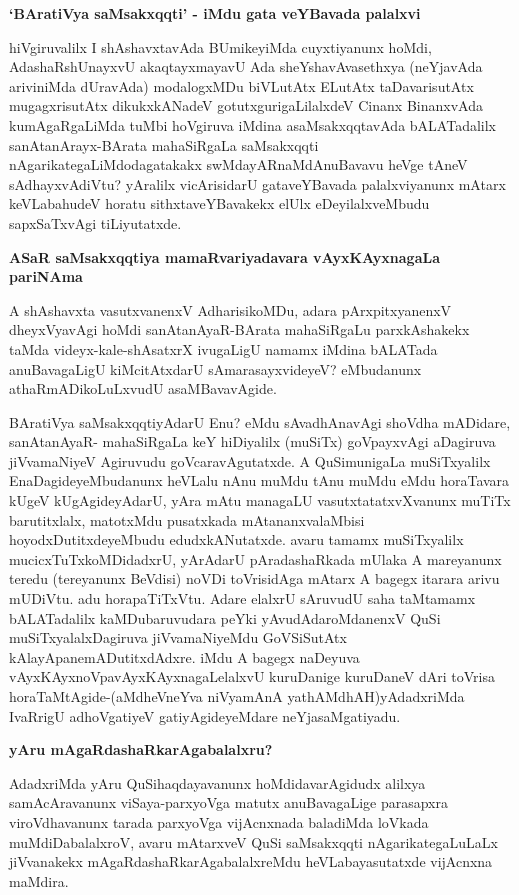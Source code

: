{\bigskip
\noindent
{\large\bf `BAratiVya saMsakxqqti' - iMdu gata veYBavada palalxvi}}\label{page23a}
\medskip

\noindent
hiVgiruvalilx I shAshavxtavAda BUmikeyiMda cuyxtiyanunx hoMdi, AdashaR\-shUnayxvU akaqtayxmayavU Ada sheYshavAvasethxya (neYjavAda ariviniMda dUravAda) modalogxMDu biVLutAtx ELutAtx taDavari\-sutAtx mugagxrisutAtx dikukxkANadeV gotutx\-guri\-gaLilalxdeV Cinanx BinanxvAda kumAgaRgaLiMda tuMbi hoVgiruva iMdina asaMsakxqqta\-vAda bALATadalilx sanAtanArayx-BArata mahaSiRgaLa saMsakxqqti nAgarikategaLiMdodaga\-takakx swMdayARnaMdAnuBavavu heVge tAneV sAdhayxvAdiVtu? yAralilx vicArisi\-darU gataveYBavada palalxviyanunx mAtarx keVLabahudeV horatu sithxtaveYBavakekx elUlx eDeyilalxveMbudu sapxSaTxvAgi tiLiyu\-tatxde.

\newpage

{\medskip
\noindent
{\large\bf ASaR saMsakxqqtiya mamaRvariyadavara vAyxKAyxnagaLa pariNAma}}
\medskip

\noindent
A shAshavxta vasutxvanenxV AdharisikoMDu, adara pArxpitxyanenxV dheyxVyavAgi hoMdi sanAtanAyaR-\-BArata mahaSiRgaLu parxkAshakekx taMda videyx-kale-shAsatxrX ivugaLigU namamx iMdina bALATada anuBava\-gaLigU kiMci\-tAtxdarU sAmarasayxvideyeV? eMbudanunx athaRmADikoLuLxvudU asaMBavavAgide.

BAratiVya saMsakxqqtiyAdarU Enu? eMdu sAvadhAnavAgi shoVdha mADi\-dare, sanAtanAyaR-\- mahaSiRgaLa keY hiDiyalilx (muSiTx) goVpayxvAgi aDagiruva jiVvamaNiyeV Agiruvudu goVcara\-vAgu\-tatxde. A QuSimunigaLa muSiTxyalilx EnaDagideyeMbudanunx heVLalu nAnu muMdu tAnu muMdu eMdu horaTavara kUgeV kUgAgideyAdarU, yAra mAtu managaLU vasutxtatatxvXvanunx muTiTx baru\-titxlalx, matotxMdu pusatxkada mAtananxvalaMbisi hoyodxDutitxdeyeMbudu edudx\break kANutatxde. avaru tamamx muSiTxyalilx mucicxTuTxkoMDidadxrU, yArAdarU pAra\-dashaRkada mUlaka A mareyanunx teredu (tere\-yanunx BeVdisi) noVDi toVrisidAga mAtarx A bagegx itarara arivu mUDiVtu. adu hora\-paTiTxVtu. Adare elalxrU sAru\-vudU saha taMtamamx bALATadalilx kaMDubaruvudara peYki yAvu\-dAda\break\-roMdanenxV QuSi muSiTxyalalxDagiruva jiVvamaNiyeMdu GoVSiSutAtx kAla\break yApane\-mADu\-titxdAdxre. iMdu A bagegx naDeyuva vAyxKAyxnoVpavAyxKAyxna\-gaLelalxvU kuruDanige kuruDaneV dAri toVrisa horaTaMtA\-gide-(aMdheVneYva niVyamAnA yathAMdhAH\label{24})yAdadxriMda IvaRrigU adhoVgatiyeV gati\-yAgide\-yeMdare neYjasaMgatiyadu.

{\medskip
\noindent
{\large\bf yAru mAgaRdashaRkarAgabalalxru?}}
\medskip

\noindent
 AdadxriMda yAru QuSihaqdayavanunx hoMdidavarAgidudx alilxya samAcAra\-vanunx viSaya-parx\-yoVga matutx anuBavagaLige parasapxra viroVdhavanunx tarada parxyoVga vijAcnxnada baladiMda loVkada muMdiDa\-balalxroV, avaru mAtarxveV QuSi saMsakxqqti nAgarikategaLuLaLx jiVvanakekx mAgaRdashaRka\-rAga\-balalx\-reMdu heVLa\-bayasutatxde vijAcnxna maMdira.

